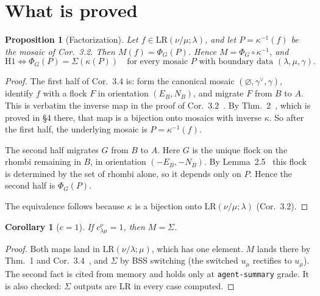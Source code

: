 \documentclass[11pt]{article}
\newtheorem{proposition}[theorem]{Proposition}
\newtheorem{corollary}[theorem]{Corollary}
\theoremstyle{definition}
\newcommand{\LR}{\mathrm{LR}}
\begin{document}
\section{What is proved}
\begin{proposition}[Factorization]\label{prop:fact}
Let $f\in\LR(\nu/\mu;\lambda)$, and let $P=\kappa^{-1}(f)$ be the mosaic of Cor.~3.2. Then $M(f)=\Phi_G(P)$. Hence
$M=\Phi_G\circ\kappa^{-1}$, and
\[
\text{H1}\iff \Phi_G(P)=\Sigma(\kappa(P))\quad\text{for every mosaic $P$ with boundary data $(\lambda,\mu,\gamma)$.}
\]
\end{proposition}
\begin{proof}
The first half of Cor.~3.4 is: form the canonical mosaic $(\varnothing,\gamma^\vee,\gamma)$, identify $f$ with a flock
$F$ in orientation $(E_B,N_B)$, and migrate $F$ from $B$ to $A$. This is verbatim the inverse map in the proof of
Cor.~3.2~\cite[p.~15]{P}. By Thm.~2~\cite{P}, which is proved in \S4 there, that map is a bijection onto mosaics with
inverse $\kappa$. So after the first half, the underlying mosaic is $P=\kappa^{-1}(f)$.

The second half migrates $G$ from $B$ to $A$. Here $G$ is the unique flock on the rhombi remaining in $B$, in orientation
$(-E_B,-N_B)$. By Lemma~2.5~\cite{P} this flock is determined by the set of rhombi alone, so it depends only on $P$.
Hence the second half is $\Phi_G(P)$.

The equivalence follows because $\kappa$ is a bijection onto $\LR(\nu/\mu;\lambda)$ (Cor.~3.2).
\end{proof}

\begin{corollary}[$c=1$]
If $c^\nu_{\lambda\mu}=1$, then $M=\Sigma$.
\end{corollary}
\begin{proof}
Both maps land in $\LR(\nu/\lambda;\mu)$, which has one element. $M$ lands there by Thm.~1 and Cor.~3.4~\cite{P}, and
$\Sigma$ by BSS switching (the switched $u_\mu$ rectifies to $u_\mu$). The second fact is cited from memory and holds
only at \texttt{agent-summary} grade. It is also checked: $\Sigma$ outputs are LR in every case computed.
\end{proof}
\end{document}
